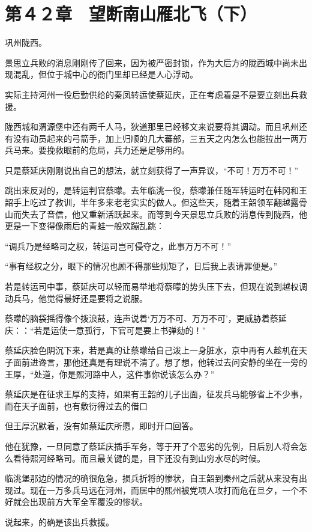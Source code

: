 \section{第４２章　望断南山雁北飞（下）}

巩州陇西。

景思立兵败的消息刚刚传了回来，因为被严密封锁，作为大后方的陇西城中尚未出现混乱，但位于城中心的衙门里却已经是人心浮动。

实际主持河州一役后勤供给的秦凤转运使蔡延庆，正在考虑着是不是要立刻出兵救援。

陇西城和渭源堡中还有两千人马，狄道那里已经移文来说要将其调动。而且巩州还有没有动员起来的弓箭手，加上归顺的几大蕃部，三五天之内怎么也能拉出一两万兵马来。要挽救眼前的危局，兵力还是足够用的。

只是蔡延庆刚刚说出自己的想法，就立刻获得了一声异议，“不可！万万不可！”

跳出来反对的，是转运判官蔡曚。去年临洮一役，蔡曚兼任随军转运时在韩冈和王韶手上吃过了教训，半年多来老老实实的做人。但这些天，随着王韶领军翻越露骨山而失去了音信，他又重新活跃起来。而等到今天景思立兵败的消息传到陇西，他更是一下变得像雨后的青蛙一般欢蹦乱跳：

“调兵乃是经略司之权，转运司岂可侵夺之，此事万万不可！”

“事有经权之分，眼下的情况也顾不得那些规矩了，日后我上表请罪便是。”

若是转运司中事，蔡延庆可以轻而易举地将蔡曚的势头压下去，但现在说到越权调动兵马，他觉得最好还是要将之说服。

蔡曚的脑袋摇得像个拨浪鼓，连声说着‘万万不可、万万不可’，更威胁着蔡延庆：：“若是运使一意孤行，下官可是要上书弹劾的！”

蔡延庆脸色阴沉下来，若是真的让蔡曚给自己泼上一身脏水，京中再有人趁机在天子面前进谗言，那他还真是有理说不清了。想了想，他转过去问安静的坐在一旁的王厚，“处道，你是熙河路中人，这件事你说该怎么办？”

蔡延庆是在征求王厚的支持，如果有王韶的儿子出面，征发兵马能够省上不少事，而在天子面前，也有敷衍得过去的借口

但王厚沉默着，没有如蔡延庆所愿，即时开口回答。

他在犹豫，一旦同意了蔡延庆插手军务，等于开了个恶劣的先例，日后别人将会怎么看待熙河经略司。而且最关键的是，目下还没有到山穷水尽的时候。

临洮堡那边的情况的确很危急，损兵折将的惨状，自王韶到秦州之后就从来没有出现过。现在一万多兵马远在河州，而居中的熙州被党项人攻打而危在旦夕，一个不好就会出现前方大军全军覆没的惨状。

说起来，的确是该出兵救援。

